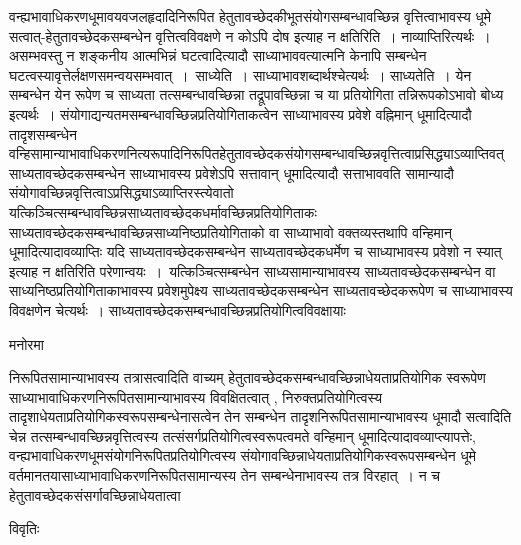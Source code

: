 \documentclass[10pt, openany]{book}
\begin{document}
{वन्ह्यभावाधिकरणधूमावयवजलहृदादिनिरूपित हेतुतावच्छेदकीभूतसंयोगसम्बन्धावच्छिन्न वृत्तित्वाभावस्य धूमे सत्वात्-हेतुतावच्छेदकसम्बन्धेन वृत्तित्वविवक्षणे न कोऽपि दोष इत्याह \textendash न {\la क्षतिरिति}~। नाव्याप्तिरित्यर्थः~। असम्भवस्तु न शङ्कनीय आत्मभिन्नं घटत्वादित्यादौ साध्याभाववत्यात्मनि केनापि सम्बन्धेन घटत्वस्यावृत्तेर्लक्षणसमन्वयसम्भवात्~।~{\la साध्येति~।} साध्याभावशब्दार्थश्चेत्यर्थः~। {\la साध्यतेति~।} येन सम्बन्धेन येन रूपेण च साध्यता तत्सम्बन्धावच्छिन्ना तद्रूपावच्छिन्ना च या प्रतियोगिता तन्निरूपकोऽभावो बोध्य इत्यर्थः~। संयोगाद्यन्यतमसम्बन्धावच्छिन्नप्रतियोगिताकत्वेन साध्याभावस्य प्रवेशे वह्निमान् धूमादित्यादौ तादृशसम्बन्धेन वन्हिसामान्याभावाधिकरणनित्यरूपादिनिरूपितहेतुतावच्छेदकसंयोगसम्बन्धावच्छिन्नवृत्तित्वाप्रसिद्ध्याऽव्याप्तिवत् साध्यतावच्छेदकसम्बन्धेन साध्याभावस्य प्रवेशेऽपि सत्तावान् धूमादित्यादौ सत्ताभाववति सामान्यादौ संयोगावच्छिन्नवृत्तित्वाऽप्रसिद्ध्याऽव्याप्तिरस्त्येवातो यत्किञ्चित्सम्बन्धावच्छिन्नसाध्यतावच्छेदकधर्मावच्छिन्नप्रतियोगिताकः साध्यतावच्छेदकसम्बन्धावच्छिन्नसाध्यनिष्ठप्रतियोगिताको वा साध्याभावो वक्तव्यस्तथापि वन्हिमान् धूमादित्यादावव्याप्तिः यदि साध्यतावच्छेदकसम्बन्धेन साध्यतावच्छेदकधर्मेण च साध्याभावस्य प्रवेशो न स्यात् इत्याह न क्षतिरिति परेणान्वयः~।~यत्किञ्चित्सम्बन्धेन साध्यसामान्याभावस्य साध्यतावच्छेदकसम्बन्धेन वा साध्यनिष्ठप्रतियोगिताकाभावस्य प्रवेशमुपेक्ष्य साध्यतावच्छेदकसम्बन्धेन साध्यतावच्छेदकरूपेण च
साध्याभावस्य विवक्षणेन चेत्यर्थः~। साध्यतावच्छेदकसम्बन्धावच्छिन्नप्रतियोगित्वविवक्षायाः

\begin{center}   मनोरमा  \end{center}
निरूपितसामान्याभावस्य तत्रासत्वादिति वाच्यम् हेतुतावच्छेदकसम्बन्धावच्छिन्नाधेयताप्रतियोगिक स्वरूपेण साध्याभावाधिकरणनिरूपितसामान्याभावस्य विवक्षितत्वात् ,
निरुक्तप्रतियोगित्वस्य तादृशाधेयताप्रतियोगिकस्वरूपसम्बन्धेनासत्वेन तेन सम्बन्धेन तादृशनिरूपितसामान्याभावस्य धूमादौ सत्वादिति चेन्न तत्सम्बन्धावच्छिन्नवृत्तित्वस्य
तत्संसर्गप्रतियोगित्वस्वरूपत्वमते वन्हिमान् धूमादित्यादावव्याप्त्यापत्तेः, वन्ह्यभावाधिकरणधूमसंयोगनिरूपितप्रतियोगित्वस्य संयोगावच्छिन्नाधेयताप्रतियोगिकस्वरूपसम्बन्धेन धूमे वर्तमानतयासाध्याभावाधिकरणनिरूपितसामान्यस्य तेन सम्बन्धेनाभावस्य तत्र विरहात्~। न च हेतुतावच्छेदकसंसर्गावच्छिन्नाधेयतात्वा
\newpage
\begin{center}     विवृतिः \end{center}

}
\end{document}
